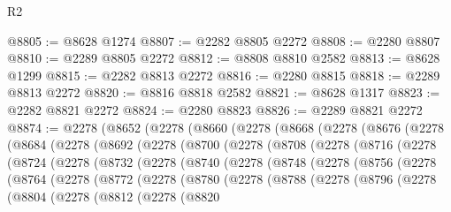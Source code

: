 \begin{lexlean}{R2}
\begin{coremodule}
@8805 := @8628 @1274
@8807 := @2282 @8805 @2272
@8808 := @2280 @8807
@8810 := @2289 @8805 @2272
@8812 := @8808 @8810 @2582
@8813 := @8628 @1299
@8815 := @2282 @8813 @2272
@8816 := @2280 @8815
@8818 := @2289 @8813 @2272
@8820 := @8816 @8818 @2582
@8821 := @8628 @1317
@8823 := @2282 @8821 @2272
@8824 := @2280 @8823
@8826 := @2289 @8821 @2272
@8874 := @2278
    (@8652
      (@2278
        (@8660
          (@2278
            (@8668
              (@2278
                (@8676
                  (@2278
                    (@8684
                      (@2278
                        (@8692
                          (@2278
                            (@8700
                              (@2278
                                (@8708
                                  (@2278
                                    (@8716
                                      (@2278
                                        (@8724
                                          (@2278
                                            (@8732
                                              (@2278
                                                (@8740
                                                  (@2278
                                                    (@8748
                                                      (@2278
                                                        (@8756
                                                          (@2278
                                                            (@8764
                                                              (@2278
                                                                (@8772
                                                                  (@2278
                                                                    (@8780
                                                                      (@2278
                                                                        (@8788
                                                                          (@2278
                                                                            (@8796
                                                                              (@2278
                                                                                (@8804
                                                                                  (@2278
                                                                                    (@8812
                                                                                      (@2278
                                                                                        (@8820

\end{coremodule}
\end{lexlean}
